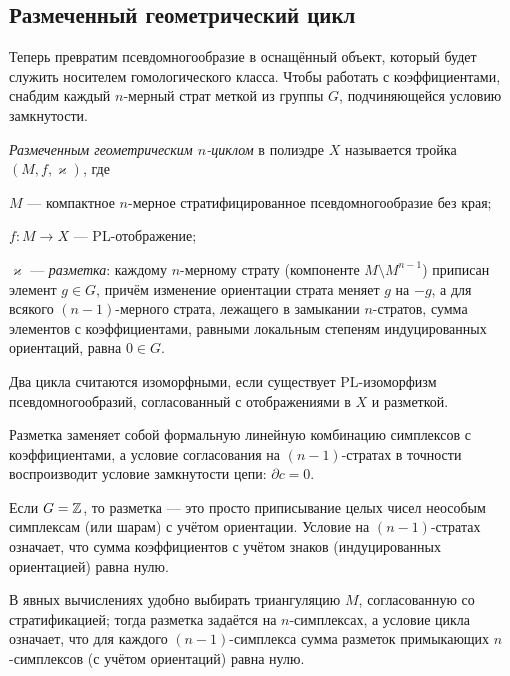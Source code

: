 \documentclass[12pt]{article}
\begin{document}
\subsection{Размеченный геометрический цикл}

Теперь превратим псевдомногообразие в оснащённый объект, который будет служить носителем гомологического класса. Чтобы работать с коэффициентами, снабдим каждый $n$-мерный страт меткой из группы $G$, подчиняющейся условию замкнутости.

\begin{definition}\label{def:geomcycle}
\emph{Размеченным геометрическим $n$-циклом} в полиэдре $X$ называется тройка $(M, f, \varkappa)$, где
\begin{conditions}
\item $M$ --- компактное $n$-мерное стратифицированное псевдомногообразие без края;
\item $f : M \to X$ --- PL-отображение;
\item $\varkappa$ --- \emph{разметка}: каждому $n$-мерному страту (компоненте $M \setminus M^{n-1}$) приписан элемент $g \in G$, причём изменение ориентации страта меняет $g$ на $-g$, а для всякого $(n-1)$-мерного страта, лежащего в замыкании $n$-стратов, сумма элементов с коэффициентами, равными локальным степеням индуцированных ориентаций, равна $0 \in G$.
\end{conditions}
Два цикла считаются изоморфными, если существует PL-изоморфизм псевдомногообразий, согласованный с отображениями в $X$ и разметкой.
\end{definition}

Разметка заменяет собой формальную линейную комбинацию симплексов с коэффициентами, а условие согласования на $(n-1)$-стратах в точности воспроизводит условие замкнутости цепи: $\partial c = 0$.

\begin{remark}
Если $G=\mathbb Z$, то разметка --- это просто приписывание целых чисел неособым симплексам (или шарам) с учётом ориентации. Условие на $(n-1)$-стратах означает, что сумма коэффициентов с учётом знаков (индуцированных ориентацией) равна нулю.\footnotemark
\end{remark}
В явных вычислениях удобно выбирать триангуляцию $M$, согласованную со стратификацией; тогда разметка задаётся на $n$-симплексах, а условие цикла означает, что для каждого $(n-1)$-симплекса сумма разметок примыкающих $n$-сим\-плек\-сов (с учётом ориентаций) равна нулю.
\end{document}
